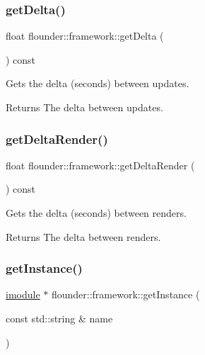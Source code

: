 \subsubsection{\texorpdfstring{get\+Delta()}{getDelta()}}
{\footnotesize\ttfamily float flounder\+::framework\+::get\+Delta (\begin{DoxyParamCaption}{ }\end{DoxyParamCaption}) const\hspace{0.3cm}{\ttfamily [inline]}}



Gets the delta (seconds) between updates. 

\begin{DoxyReturn}{Returns}
The delta between updates. 
\end{DoxyReturn}
\mbox{\label{classflounder_1_1framework_a98b4dd1aa26132eee232c2618ebb1578}} 
\subsubsection{\texorpdfstring{get\+Delta\+Render()}{getDeltaRender()}}
{\footnotesize\ttfamily float flounder\+::framework\+::get\+Delta\+Render (\begin{DoxyParamCaption}{ }\end{DoxyParamCaption}) const\hspace{0.3cm}{\ttfamily [inline]}}



Gets the delta (seconds) between renders. 

\begin{DoxyReturn}{Returns}
The delta between renders. 
\end{DoxyReturn}
\mbox{\label{classflounder_1_1framework_a84a2314d26174ab02b48bcda8fd5b4e4}} 
\subsubsection{\texorpdfstring{get\+Instance()}{getInstance()}}
{\footnotesize\ttfamily \hyperlink{classflounder_1_1imodule}{imodule} $\ast$ flounder\+::framework\+::get\+Instance (\begin{DoxyParamCaption}\item[{const std\+::string \&}]{name }\end{DoxyParamCaption})}




